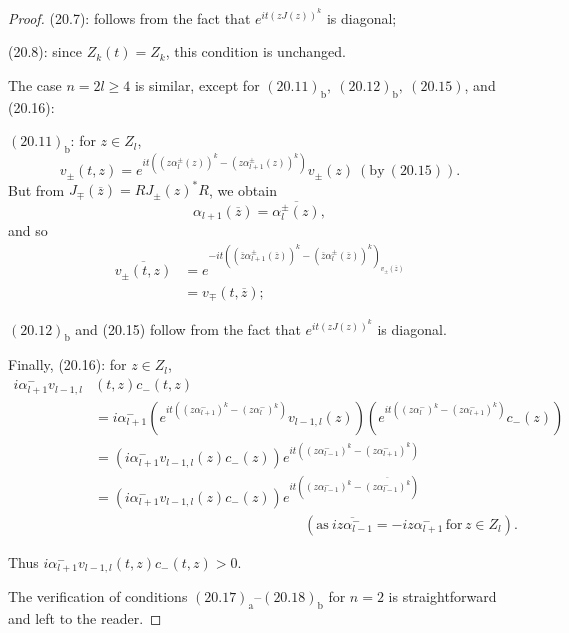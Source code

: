 \documentclass{surv-l}
\theoremstyle{plain}
\theoremstyle{definition}
\numberwithin{equation}{chapter}
\begin{document}
\begin{proof}
(20.7): follows from the fact that $e^{it(zJ(z))^{k}}$ is diagonal;

(20.8): since $Z_{k}(t)=Z_{k}$, this condition is unchanged.

The case $n=2l\geq 4$ is similar, except for $(20.11)_{\mathrm{b}},\ (20.12)_{\mathrm{b}},\ (20.15)$, and (20.16):

$(20.11)_{\mathrm{b}}$: for $z\in Z_{l}$,
\begin{equation*}
v_{\pm}(t, z)=e^{it{((z\alpha_{l}^{\pm}(z))^{k}-(z\alpha_{l+1}^{\pm}(z))^{k})}}{v_\pm}(z)\ (\mathrm{by}\ (20.15)).
\end{equation*}
But from $J_{\mp}(\overline{z})=RJ_{\pm}(z)^{*}R$, we obtain
\begin{equation*}
\alpha_{l+1}(\overline{z})=\overline{\alpha_{l}^{\pm}(z)},
\end{equation*}
and so
\begin{align*}
\overline{v_{\pm}(t,z)}&=e^{-it(({\overline{z}\alpha}_{l+1}^{\pm}(\overline{z}))^{k}-({\overline{z}\alpha}_{l}^{\pm}
(\overline{z}))^{k})_{v_{\pm}(\overline{z})}}\\
&=v_{\mp}(t,\overline{z});
\end{align*}

$(20.12)_{\mathrm{b}}$ and (20.15) follow from the fact that $e^{it(zJ(z))^{k}}$ is diagonal.

Finally, (20.16): for $z\in Z_{l}$,
\begin{align*}
i\alpha_{l+1}^{-}v_{l-1,l}&(t, z)c_{-}(t, z)\\
&=i\alpha_{l+1}^{-}(e^{it((z\alpha_{l+1}^{-})^{k}-(z\alpha_{l}^{-})^{k})}v_{l-1,l}(z))(e^{it((z\alpha_{l}^{-})^{k}-(z\alpha_{l+1}^{-})^{k})}{c_{-}(z)})\\
&=(i\alpha_{l+1}^{-}v_{l-1,l}(z)c_{-}(z))e^{it( (z\alpha_{l-1}^{-})^{k}-(z\alpha_{l+1}^{-})^{k})}\\
&=(i\alpha_{l+1}^{-}v_{l-1,l}(z)c_{-}(z))e^{it((z\alpha_{l-1}^{-})^{k}-\overline{(z\alpha_{l-1}^{-})^{k}})}\\
&\qquad\qquad\qquad\qquad\qquad\qquad\qquad\quad(\mathrm{as}\ \overline{iz\alpha_{l-1}^{-}}=-iz\alpha_{l+1}^{-}\, \mathrm{for}\, z\in Z_{l}).
\end{align*}

Thus $i\alpha_{l+1}^{-}v_{l-1,l}(t, z)c_{-}(t, z)>0$.

The verification of conditions $(20.17)_{\mathrm{a}}$--$(20.18)_{\mathrm{b}}$ for $n=2$ is straightforward and left to the reader.


\end{proof}
\end{document}
